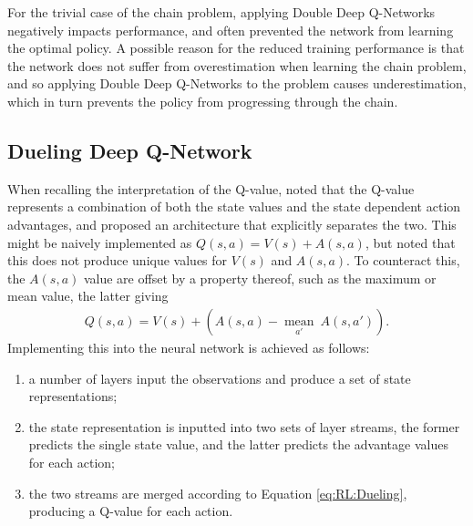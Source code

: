 For the trivial case of the chain problem, applying Double Deep Q-Networks
negatively impacts performance, and often prevented the network from learning
the optimal policy.
A possible reason for the reduced training performance is that the network does
not suffer from overestimation when learning the chain problem, and so applying
Double Deep Q-Networks to the problem causes underestimation, which in turn
prevents the policy from progressing through the chain.



\subsection{Dueling Deep Q-Network}\label{sec:RL:Dueling}

When recalling the interpretation of the Q-value, \cite{Wang:2015:Dueling} noted
that the Q-value represents a combination of both the state values and the state
dependent action advantages, and proposed an architecture that explicitly
separates the two.
This might be naively implemented as $Q(s,a) = V(s) + A(s,a)$, but
\citeauthor{Wang:2015:Dueling} noted that this does not produce unique values
for $V(s)$ and $A(s,a)$.
To counteract this, the $A(s,a)$ value are offset by a property thereof, such as
the maximum or mean value, the latter giving
\begin{align}
    Q(s,a) = V(s) + \left(A(s,a) - \underset{a'}{\operatorname{mean}}\ A(s,a')\right).
    \label{eq:RL:Dueling}
\end{align}
Implementing this into the neural network is achieved as follows:
\begin{enumerate}
    \item a number of layers input the observations and produce a set of state
        representations;
    \item the state representation is inputted into two sets of layer streams,
        the former predicts the single state value, and the latter predicts the
        advantage values for each action;
    \item the two streams are merged according to Equation \ref{eq:RL:Dueling},
        producing a Q-value for each action.
\end{enumerate}


